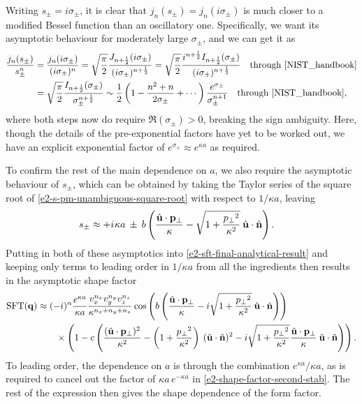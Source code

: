 Writing $s_\pm=i\sigma_\pm$, it is clear that $j_n(s_\pm)=j_n(i\sigma_\pm)$ is much closer to a modified Bessel function than an oscillatory one. Specifically, we want its asymptotic behaviour for moderately large $\sigma_\pm$, and we can get it as
\begin{align}
\frac{j_n(s_\pm)}{s_\pm^n}
& =
\frac{j_n(i \sigma_\pm)}{(i\sigma_\pm)^n}
=
\sqrt{\frac{\pi}{2}}
\frac{J_{n+\frac12}(i \sigma_\pm)}{(i\sigma_\pm)^{n+\frac12}}
=
\sqrt{\frac{\pi}{2}}
\frac{ i^{n+\frac12} I_{n+\frac12}(\sigma_\pm)}{(i\sigma_\pm)^{n+\frac12}}
\quad\text{through \citenisteq{10.27.6}}
\nonumber \\ & =
\sqrt{\frac{\pi}{2}}
\frac{ I_{n+\frac12}(\sigma_\pm)}{\sigma_\pm^{\smash[b]{n+\frac12}}}
\sim
\frac{1}{2}
\left(1-\frac{n^2+n}{2\sigma_\pm}+\cdots\right)
\frac{ 
e^{\sigma_\pm}
}{\sigma_\pm^{n+1}}
\quad\text{through \citenisteq{10.40.1}}
,
\end{align}
where both steps now do require $\Re(\sigma_\pm)>0$, breaking the sign ambiguity. Here, though the details of the pre-exponential factors have yet to be worked out, we have an explicit exponential factor of $e^{\sigma_\pm}\approx e^{\kappa a}$ as required.

To confirm the rest of the main dependence on $a$, we also require the asymptotic behaviour of $s_\pm$, which can be obtained by taking the Taylor series of the square root of \eqref{e2-s-pm-unambiguous-square-root} with respect to $1/\kappa a$, leaving
\begin{align}
s_\pm
& \approx
+i \:\! \kappa a
\: \pm \: 
b \left(
 \frac{\hat{\vb{u}}\cdot{\ensuremath{\vb{p}}_{\perp}}}{\kappa}
 -\sqrt{1+\frac{{p_{\perp}}^2}{\kappa^2}}\:\hat{\vb{u}}\cdot\hat{\vb{n}}
\right)
.
\label{e2-s-pm-leading-asymptotic}
\end{align}
Putting in both of these asymptotics into \eqref{e2-sft-final-analytical-result} and keeping only terms to leading order in $1/\kappa a$ from all the ingredients then results in the asymptotic shape factor
\begin{align}
\sft(\vbq)
& \approx
(-i)^n
\frac{e^{ \kappa a }}{\kappa a}
\frac{ v_x^{n_x}v_y^{\smash[b]{n_y}} v_z^{n_z}}{\kappa^{n_x+n_y+n_z}}
\cos\left(
b \left(
  \frac{\uu\cdot\vbpo}{\kappa}
  -i \sqrt{1+\frac{\pt^2}{\kappa^2}}\:\uu\cdot\un
 \right)
\right)
%
\label{e2-leading-asymptotic-sft}
\\ & \qquad   \times \nonumber 
%
\left( 
1 
- c\left(
  \frac{(\uu\cdot\vbpo)^2}{\kappa^2}
  -\left(1+\frac{\pt^2}{\kappa^2}\right)\:(\uu\cdot\un)^2
  -i\sqrt{1+\frac{\pt^2}{\kappa^2}}\frac{\uu\cdot\vbpo}{\kappa} \:\uu\cdot\un 
\right)
\right).
\end{align}
To leading order, the dependence on $a$ is through the combination $e^{ \kappa a }/\kappa a$, as is required to cancel out the factor of $\kappa a \, e^{-\kappa a}$ in \eqref{e2-shape-factor-second-stab}. The rest of the expression then gives the shape dependence of the form factor.




